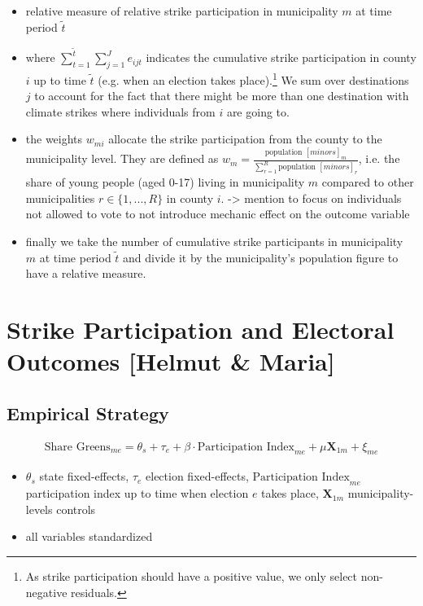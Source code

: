 \begin{itemize}
	\item relative measure of relative strike participation in municipality $m$ at time period $\tilde{t}$
	\item where $\sum_{t=1}^{\tilde{t}}\sum_{j=1}^{J} e_{ijt}$ indicates the cumulative strike participation in county $i$ up to time $\tilde{t}$ (e.g. when an election takes place).\footnote{As strike participation should have a positive value, we only select non-negative residuals.} We sum over destinations $j$ to account for the fact that there might be more than one destination with climate strikes where individuals from $i$ are going to.
	\item the weights $w_{mi}$ allocate the strike participation from the county to the municipality level. They are defined as $w_m=\tfrac{\text{population }[minors]_m}{\sum_{r=1}^{R}\text{population }[minors]_r}$, i.e. the share of young people (aged 0-17) living in municipality $m$ compared to other municipalities $r\in\{1,...,R\}$ in county $i$. -> mention to focus on individuals not allowed to vote to not introduce mechanic effect on the outcome variable
	\item finally we take the number of cumulative strike participants in municipality $m$ at time period $\tilde{t}$ and divide it by the municipality's population figure to have a relative measure.
\end{itemize}















\clearpage
\section{Strike Participation and Electoral Outcomes [Helmut \& Maria]}\label{sec_greta_cons:strike_participation_elections}
\subsection{Empirical Strategy}

\begin{align}
	\text{Share Greens}_{me} = \theta_s + \tau_e + \beta\cdot\text{Participation Index}_{me} + \mu \mathbf{X}_{1m} + \xi_{me}\label{eq_greta_cons:vote_share_greens}
\end{align}
\begin{itemize}
	\item $\theta_s$ state fixed-effects, $\tau_e$ election fixed-effects, $\text{Participation Index}_{me}$ participation index up to time when election $e$ takes place, $\mathbf{X}_{1m}$ municipality-levels controls 
	\item all variables standardized
\end{itemize}

